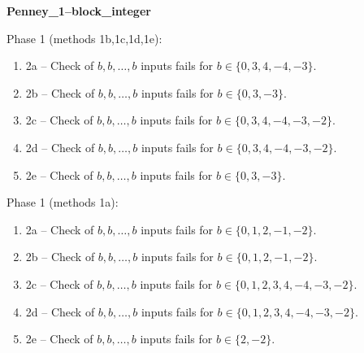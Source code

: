 \begin{exmp}
\label{ex:compareAF}

\textbf{Penney\_1--block\_integer}

Phase 1 (methods 1b,\allowbreak  1c,\allowbreak  1d,\allowbreak  1e):
\begin{enumerate}[ ]
\item  2a -- Check of $b,\allowbreak b,\allowbreak \dots,\allowbreak b$ inputs fails for $b\in \{0,\allowbreak  3,\allowbreak  4,\allowbreak  -4,\allowbreak  -3\}$.
\item  2b -- Check of $b,\allowbreak b,\allowbreak \dots,\allowbreak b$ inputs fails for $b\in \{0,\allowbreak  3,\allowbreak  -3\}$.
\item  2c -- Check of $b,\allowbreak b,\allowbreak \dots,\allowbreak b$ inputs fails for $b\in \{0,\allowbreak  3,\allowbreak  4,\allowbreak  -4,\allowbreak  -3,\allowbreak  -2\}$.
\item  2d -- Check of $b,\allowbreak b,\allowbreak \dots,\allowbreak b$ inputs fails for $b\in \{0,\allowbreak  3,\allowbreak  4,\allowbreak  -4,\allowbreak  -3,\allowbreak  -2\}$.
\item  2e -- Check of $b,\allowbreak b,\allowbreak \dots,\allowbreak b$ inputs fails for $b\in \{0,\allowbreak  3,\allowbreak  -3\}$.
\end{enumerate}


Phase 1 (methods 1a):
\begin{enumerate}[ ]
\item  2a -- Check of $b,\allowbreak b,\allowbreak \dots,\allowbreak b$ inputs fails for $b\in \{0,\allowbreak  1,\allowbreak  2,\allowbreak  -1,\allowbreak  -2\}$.
\item  2b -- Check of $b,\allowbreak b,\allowbreak \dots,\allowbreak b$ inputs fails for $b\in \{0,\allowbreak  1,\allowbreak  2,\allowbreak  -1,\allowbreak  -2\}$.
\item  2c -- Check of $b,\allowbreak b,\allowbreak \dots,\allowbreak b$ inputs fails for $b\in \{0,\allowbreak  1,\allowbreak  2,\allowbreak  3,\allowbreak  4,\allowbreak  -4,\allowbreak  -3,\allowbreak  -2\}$.
\item  2d -- Check of $b,\allowbreak b,\allowbreak \dots,\allowbreak b$ inputs fails for $b\in \{0,\allowbreak  1,\allowbreak  2,\allowbreak  3,\allowbreak  4,\allowbreak  -4,\allowbreak  -3,\allowbreak  -2\}$.
\item  2e -- Check of $b,\allowbreak b,\allowbreak \dots,\allowbreak b$ inputs fails for $b\in \{2,\allowbreak  -2\}$.
\end{enumerate}


\end{exmp}




